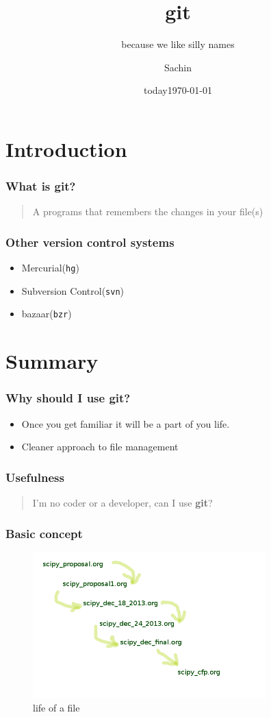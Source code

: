 \documentclass[bigger, presentation]{beamer}
\date{today}
\subtitle{because we like silly names}
\institute{Indian Institute of Technology, Bombay}
\title{git}
\author{Sachin}
\date{\today}
\begin{document}
\maketitle

\section{Introduction}
\label{sec-1}
\begin{frame}
\frametitle{What is git?}
\label{sec-1-1}

\begin{quote}
A programs that remembers the changes in your file(s)
\end{quote}
\end{frame}
\begin{frame}
\frametitle{Other version control systems}
\label{sec-1-2}

\begin{itemize}
\item Mercurial(\texttt{hg})
\item Subversion Control(\texttt{svn})
\item bazaar(\texttt{bzr})
\end{itemize}
\end{frame}
\section{Summary}
\label{sec-2}
\begin{frame}
\frametitle{Why should I use git?}
\label{sec-2-1}

\begin{itemize}
\item Once you get familiar it will be a part of you life.
\item Cleaner approach to file management
\end{itemize}
\end{frame}
\begin{frame}
\frametitle{Usefulness}
\label{sec-2-2}

\begin{quote}
I'm no coder or a developer, can I use \textbf{git}?
\end{quote}

     
\end{frame}
\begin{frame}
\frametitle{Basic concept}
\label{sec-2-3}

   \begin{figure}[htb]
   \centering
   \includegraphics[width=9cm,angle=0]{./concept.png}
   \caption{\label{fig:life-of-file}life of a file}
   \end{figure}
\end{frame}
\end{document}
